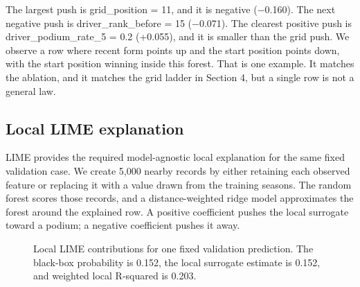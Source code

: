 \documentclass[10pt,a4paper]{article}
\begin{document}
The largest push is grid\_position = 11, and it is negative ($-$0.160). The next negative push is driver\_rank\_before = 15 ($-$0.071). The clearest positive push is driver\_podium\_rate\_5 = 0.2 (+0.055), and it is smaller than the grid push. We observe a row where recent form points up and the start position points down, with the start position winning inside this forest. That is one example. It matches the ablation, and it matches the grid ladder in Section 4, but a single row is not a general law.



\subsection{Local LIME explanation}


LIME provides the required model-agnostic local explanation for the same fixed validation case. We create 5,000 nearby records by either retaining each observed feature or replacing it with a value drawn from the training seasons. The random forest scores those records, and a distance-weighted ridge model approximates the forest around the explained row. A positive coefficient pushes the local surrogate toward a podium; a negative coefficient pushes it away.


\begin{figure}[H]
\centering
{}
\caption{Local LIME contributions for one fixed validation prediction. The black-box probability is 0.152, the local surrogate estimate is 0.152, and weighted local R-squared is 0.203.}
\end{figure}
\end{document}
